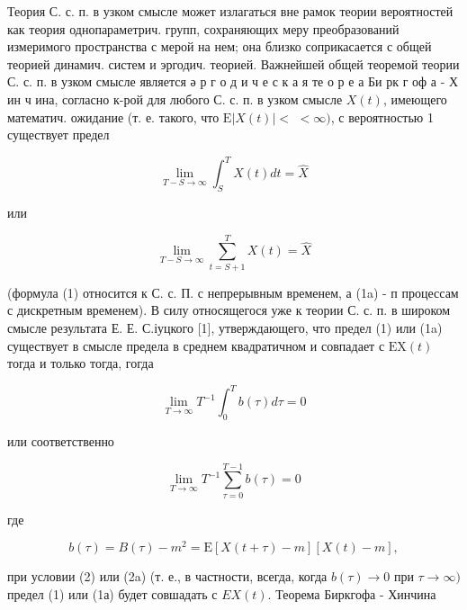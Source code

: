 \documentclass[10pt]{article}
\begin{document}
Теория С. с. п. в узком смысле может излагаться вне рамок теории вероятностей как теория однопараметрич. групп, сохраняющих меру преобразований измеримого пространства с мерой на нем; она близко соприкасается с общей теорией динамич. систем и эргодич. теорией. Важнейшей общей теоремой теории С. с. п. в узком смысле является ә р г о д и ч е с к а я те о р е а Би рк г оф а - Х ин ч ина, согласно к-рой для любого С. с. п. в узком смысле $X(t)$, имеющего математич. ожидание (т. е. такого, что $\mathrm{E}|X(t)|<$ $<\infty)$, с вероятностью 1 существует предел



\[

\lim _{T-S \rightarrow \infty} \int_{S}^{T} X(t) d t=\hat{X}

\]



или



\[

\lim _{T-S \rightarrow \infty} \sum_{t=S+1}^{T} X(t)=\hat{X}

\]



(формула (1) относится к С. с. П. с непрерывным временем, а (1a) - п процессам с дискретным временем). В силу относящегося уже к теории С. с. п. в широком смысле результата Е. Е. С.іуцкого [1], утверждающего, что предел (1) или (1a) существует в смысле предела в среднем квадратичном и совпадает с $\mathrm{EX}(t)$ тогда и только тогда, гогда



\[

\lim _{T \rightarrow \infty} T^{-1} \int_{0}^{T} b(\tau) d \tau=0

\]



или соответственно



\[

\lim _{T \rightarrow \infty} T^{-1} \sum_{\tau=0}^{T-1} b(\tau)=0

\]



где



\[

b(\tau)=B(\tau)-m^{2}=\mathrm{E}[X(t+\tau)-m][X(t)-m],

\]



при условии (2) или (2a) (т. е., в частности, всегда, когда $b(\tau) \rightarrow 0$ при $\tau \rightarrow \infty)$ предел (1) или (1а) будет совшадать с $E X(t)$. Теорема Биркгофа - Хинчина
\end{document}
